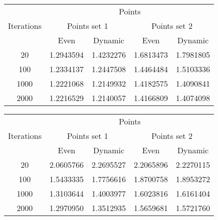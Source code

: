 \begin{center}
	\begin{tabular}{|c|c|c|c|c|}
		\hline
		\multirow{3}{*}{Iterations}	&	\multicolumn{4}{c|}{Points}	\\
										\cline{2-5}
									&	\multicolumn{2}{c|}{Points set 1}	& \multicolumn{2}{c|}{Points set 2} \\
										\cline{2-5}
									&	Even			&	Dynamic			&	Even			&	Dynamic		\\
		\hline								
		20							& 1.2943594 \cellcolor[gray]{0.9}		& 1.4232276			& 1.6813473 \cellcolor[gray]{0.9}		& 1.7981805		\\
		\hline
		100							& 1.2334137 \cellcolor[gray]{0.9}		& 1.2447508 		& 1.4464484 \cellcolor[gray]{0.9}		& 1.5103336		\\
		\hline
		1000						& 1.2221068 		& 1.2149932 \cellcolor[gray]{0.9}		& 1.4182575 		& 1.4090841	\cellcolor[gray]{0.9}	\\
		\hline
		2000						& 1.2216529 		& 1.2140057 \cellcolor[gray]{0.9}		& 1.4166809 		& 1.4074098	\cellcolor[gray]{0.9}	\\
		\hline
	\end{tabular}
	\label{tab:selection_type}
\end{center}

\begin{center}
	\begin{tabular}{|c|c|c|c|c|}
		\hline
		\multirow{3}{*}{Iterations}	&	\multicolumn{4}{c|}{Points}	\\
										\cline{2-5}
									&	\multicolumn{2}{c|}{Points set 1}	& \multicolumn{2}{c|}{Points set 2} \\
										\cline{2-5}
									&	Even			&	Dynamic			&	Even			&	Dynamic		\\
	\hline								
	20								&	2.0605766		&	2.2695527		&	2.2065896		&	2.2270115	\\
	\hline
	100								&	1.5433335		&	1.7756616		&	1.8700758		&	1.8953272	\\
	\hline
	1000 							&	1.3103644		&	1.4003977		&	1.6023816		&	1.6161404	\\
	\hline
	2000							&	1.2970950		&	1.3512935		&	1.5659681		&	1.5721760	\\
	\hline
	\end{tabular}
	\label{tab:selection_type}
\end{center}
